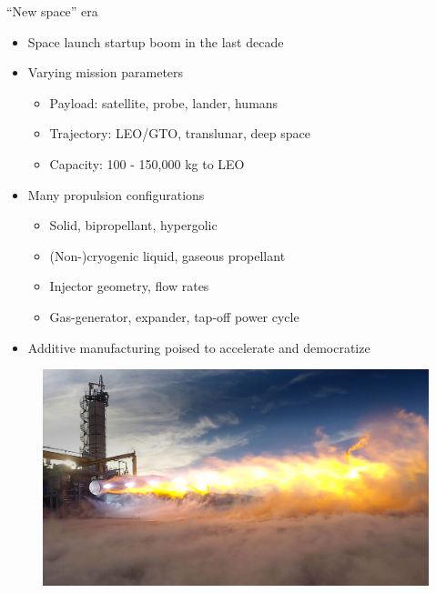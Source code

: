 \documentclass[]{beamer}
\begin{document}
\begin{frame}{``New space'' era}
    \begin{itemize}
        \item Space launch startup boom in the last decade
        \item Varying mission parameters
        \begin{itemize}
            \item Payload: satellite, probe, lander, humans
            \item Trajectory: LEO/GTO, translunar, deep space
            \item Capacity: 100 - 150,000 kg to LEO
        \end{itemize}  
        \item Many propulsion configurations
        \begin{itemize}
            \item Solid, bipropellant, hypergolic
            \item (Non-)cryogenic liquid, gaseous propellant 
            \item Injector geometry, flow rates
            \item Gas-generator, expander, tap-off power cycle
        \end{itemize}
        \item Additive manufacturing poised to accelerate and democratize
    \end{itemize}
	\begin{minipage}{0.33\linewidth}
		\begin{figure}
			\includegraphics[width=0.99\linewidth]{be4.jpg}
		\end{figure}
	\end{minipage}
	\begin{minipage}{0.33\linewidth}
		\begin{figure}

\end{figure}
\end{minipage}
\end{frame}
\end{document}
